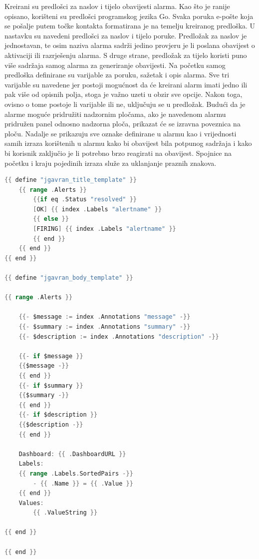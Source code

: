 Kreirani su predlošci za naslov i tijelo obavijesti alarma. Kao što je ranije opisano, korišteni su predlošci programskog jezika Go. Svaka poruka e-pošte koja se pošalje putem točke kontakta formatirana je na temelju kreiranog predloška. U nastavku su navedeni predlošci za naslov i tijelo poruke. Predložak za naslov je jednostavan, te osim naziva alarma sadrži jedino provjeru je li poslana obavijest o aktivaciji ili razrješenju alarma. S druge strane, predložak za tijelo koristi puno više sadržaja samog alarma za generiranje obavijesti. Na početku samog predloška definirane su varijable za poruku, sažetak i opis alarma. Sve tri varijable su navedene jer postoji mogućnost da će kreirani alarm imati jedno ili pak više od opisnih polja, stoga je važno uzeti u obzir sve opcije. Nakon toga, ovisno o tome postoje li varijable ili ne, uključuju se u predložak. Budući da je alarme moguće pridružiti nadzornim pločama, ako je navedenom alarmu pridružen panel odnosno nadzorna ploča, prikazat će se izravna poveznica na ploču. Nadalje se prikazuju sve oznake definirane u alarmu kao i vrijednosti samih izraza korištenih u alarmu kako bi obavijest bila potpunog sadržaja i kako bi korisnik zaključio je li potrebno brzo reagirati na obavijest. Spojnice na početku i kraju pojedinih izraza služe za uklanjanje praznih znakova. 

\begin{lstlisting}[caption={Predlošci za naslov i tijelo obavijesti alarma}, language=go]
{{ define "jgavran_title_template" }}
	{{ range .Alerts }}
		{{if eq .Status "resolved" }}
		[OK] {{ index .Labels "alertname" }}
		{{ else }}
		[FIRING] {{ index .Labels "alertname" }}
		{{ end }}
	{{ end }}
{{ end }}

{{ define "jgavran_body_template" }}

{{ range .Alerts }}

	{{- $message := index .Annotations "message" -}}
	{{- $summary := index .Annotations "summary" -}}
	{{- $description := index .Annotations "description" -}}
	
	{{- if $message }}
	{{$message -}}
	{{ end }}
	{{- if $summary }}
	{{$summary -}}
	{{ end }}
	{{- if $description }}
	{{$description -}}
	{{ end }}
	
	Dashboard: {{ .DashboardURL }}
	Labels:
	{{ range .Labels.SortedPairs -}}
		- {{ .Name }} = {{ .Value }}
	{{ end }}
	Values:
		{{ .ValueString }}
	
{{ end }}

{{ end }}
\end{lstlisting}

